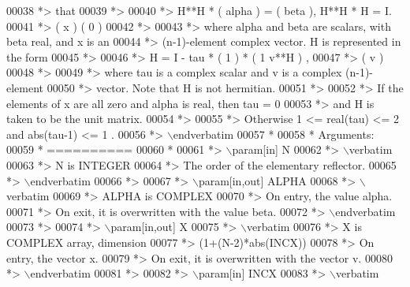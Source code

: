 \begin{DoxyCode}
00038 \textcolor{comment}{*> that}
00039 \textcolor{comment}{*>}
00040 \textcolor{comment}{*>       H**H * ( alpha ) = ( beta ),   H**H * H = I.}
00041 \textcolor{comment}{*>              (   x   )   (   0  )}
00042 \textcolor{comment}{*>}
00043 \textcolor{comment}{*> where alpha and beta are scalars, with beta real, and x is an}
00044 \textcolor{comment}{*> (n-1)-element complex vector. H is represented in the form}
00045 \textcolor{comment}{*>}
00046 \textcolor{comment}{*>       H = I - tau * ( 1 ) * ( 1 v**H ) ,}
00047 \textcolor{comment}{*>                     ( v )}
00048 \textcolor{comment}{*>}
00049 \textcolor{comment}{*> where tau is a complex scalar and v is a complex (n-1)-element}
00050 \textcolor{comment}{*> vector. Note that H is not hermitian.}
00051 \textcolor{comment}{*>}
00052 \textcolor{comment}{*> If the elements of x are all zero and alpha is real, then tau = 0}
00053 \textcolor{comment}{*> and H is taken to be the unit matrix.}
00054 \textcolor{comment}{*>}
00055 \textcolor{comment}{*> Otherwise  1 <= real(tau) <= 2  and  abs(tau-1) <= 1 .}
00056 \textcolor{comment}{*> \(\backslash\)endverbatim}
00057 \textcolor{comment}{*}
00058 \textcolor{comment}{*  Arguments:}
00059 \textcolor{comment}{*  ==========}
00060 \textcolor{comment}{*}
00061 \textcolor{comment}{*> \(\backslash\)param[in] N}
00062 \textcolor{comment}{*> \(\backslash\)verbatim}
00063 \textcolor{comment}{*>          N is INTEGER}
00064 \textcolor{comment}{*>          The order of the elementary reflector.}
00065 \textcolor{comment}{*> \(\backslash\)endverbatim}
00066 \textcolor{comment}{*>}
00067 \textcolor{comment}{*> \(\backslash\)param[in,out] ALPHA}
00068 \textcolor{comment}{*> \(\backslash\)verbatim}
00069 \textcolor{comment}{*>          ALPHA is COMPLEX}
00070 \textcolor{comment}{*>          On entry, the value alpha.}
00071 \textcolor{comment}{*>          On exit, it is overwritten with the value beta.}
00072 \textcolor{comment}{*> \(\backslash\)endverbatim}
00073 \textcolor{comment}{*>}
00074 \textcolor{comment}{*> \(\backslash\)param[in,out] X}
00075 \textcolor{comment}{*> \(\backslash\)verbatim}
00076 \textcolor{comment}{*>          X is COMPLEX array, dimension}
00077 \textcolor{comment}{*>                         (1+(N-2)*abs(INCX))}
00078 \textcolor{comment}{*>          On entry, the vector x.}
00079 \textcolor{comment}{*>          On exit, it is overwritten with the vector v.}
00080 \textcolor{comment}{*> \(\backslash\)endverbatim}
00081 \textcolor{comment}{*>}
00082 \textcolor{comment}{*> \(\backslash\)param[in] INCX}
00083 \textcolor{comment}{*> \(\backslash\)verbatim}

\end{DoxyCode}
